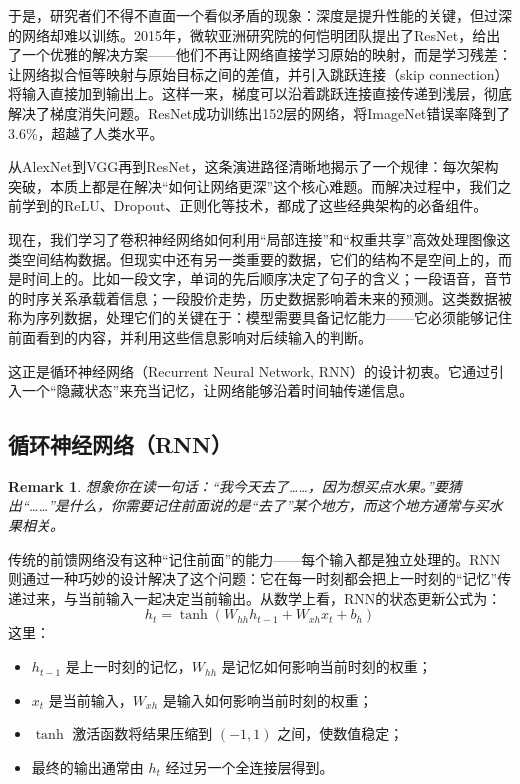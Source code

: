 \documentclass[lang=cn,zihao=-4,a4paper,fontset=windows]{beautybook}
\newtheorem*{remark}{\textbf{Remark}}
\begin{document}
于是，研究者们不得不直面一个看似矛盾的现象：深度是提升性能的关键，但过深的网络却难以训练。2015年，微软亚洲研究院的何恺明团队提出了ResNet，给出了一个优雅的解决方案——他们不再让网络直接学习原始的映射，而是学习残差：让网络拟合恒等映射与原始目标之间的差值，并引入跳跃连接（skip connection）将输入直接加到输出上。这样一来，梯度可以沿着跳跃连接直接传递到浅层，彻底解决了梯度消失问题。ResNet成功训练出152层的网络，将ImageNet错误率降到了3.6\%，超越了人类水平。

从AlexNet到VGG再到ResNet，这条演进路径清晰地揭示了一个规律：每次架构突破，本质上都是在解决“如何让网络更深”这个核心难题。而解决过程中，我们之前学到的ReLU、Dropout、正则化等技术，都成了这些经典架构的必备组件。

现在，我们学习了卷积神经网络如何利用“局部连接”和“权重共享”高效处理图像这类空间结构数据。但现实中还有另一类重要的数据，它们的结构不是空间上的，而是时间上的。比如一段文字，单词的先后顺序决定了句子的含义；一段语音，音节的时序关系承载着信息；一段股价走势，历史数据影响着未来的预测。这类数据被称为序列数据，处理它们的关键在于：模型需要具备记忆能力——它必须能够记住前面看到的内容，并利用这些信息影响对后续输入的判断。

这正是循环神经网络（Recurrent Neural Network, RNN）的设计初衷。它通过引入一个“隐藏状态”来充当记忆，让网络能够沿着时间轴传递信息。

\subsection{循环神经网络（RNN）}

\begin{remark}
想象你在读一句话：“我今天去了……，因为想买点水果。”要猜出“……”是什么，你需要记住前面说的是“去了”某个地方，而这个地方通常与买水果相关。
\end{remark}
传统的前馈网络没有这种“记住前面”的能力——每个输入都是独立处理的。RNN则通过一种巧妙的设计解决了这个问题：它在每一时刻都会把上一时刻的“记忆”传递过来，与当前输入一起决定当前输出。从数学上看，RNN的状态更新公式为：
\[
h_t = \tanh(W_{hh}h_{t-1} + W_{xh}x_t + b_h)
\]
这里：
\begin{itemize}
\item $h_{t-1}$ 是上一时刻的记忆，$W_{hh}$ 是记忆如何影响当前时刻的权重；
\item $x_t$ 是当前输入，$W_{xh}$ 是输入如何影响当前时刻的权重；
\item $\tanh$ 激活函数将结果压缩到 $(-1,1)$ 之间，使数值稳定；
\item 最终的输出通常由 $h_t$ 经过另一个全连接层得到。
\end{itemize}
\end{document}
